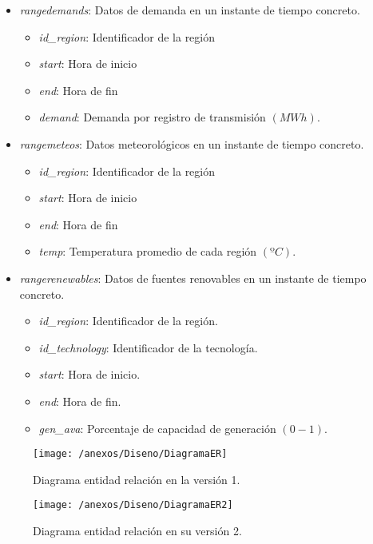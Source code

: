 \begin{itemize}
	\item \textit{rangedemands}: Datos de demanda en un instante de tiempo concreto.
	\begin{itemize}
		\item \textit{id\_region}: Identificador de la región
		\item \textit{start}: Hora de inicio
		\item \textit{end}: Hora de fin
		\item \textit{demand}: Demanda por registro de transmisión $ (MWh) $.
	\end{itemize}
	
	\item \textit{rangemeteos}: Datos meteorológicos en un instante de tiempo concreto.
	\begin{itemize}
		\item \textit{id\_region}: Identificador de la región
		\item \textit{start}: Hora de inicio
		\item \textit{end}: Hora de fin
		\item \textit{temp}: Temperatura promedio de cada región $ (ºC) $.
	\end{itemize}
	
	\item \textit{rangerenewables}: Datos de fuentes renovables en un instante de tiempo concreto.
	\begin{itemize}
		\item \textit{id\_region}: Identificador de la región.
		\item \textit{id\_technology}: Identificador de la tecnología.
		\item \textit{start}: Hora de inicio.
		\item \textit{end}: Hora de fin.
		\item \textit{gen\_ava}: Porcentaje de capacidad de generación $ (0 - 1) $.
	\end{itemize}

\end{itemize}

\begin{figure}[h]
	\centering
	\texttt{[image: /anexos/Diseno/DiagramaER]}
	\caption{Diagrama entidad relación en la versión 1.}
	\label{img:modeloER}
\end{figure}

\begin{figure}[h]
	\centering
	\texttt{[image: /anexos/Diseno/DiagramaER2]}
	\caption{Diagrama entidad relación en su versión 2.}
	\label{img:modeloER2}
\end{figure}

